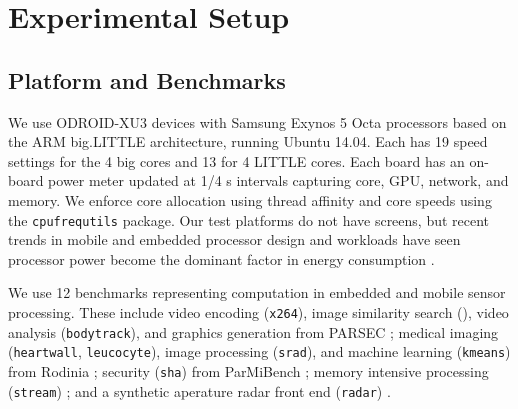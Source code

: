 \section{Experimental Setup}

\subsection{Platform and Benchmarks}
We use ODROID-XU3 devices with Samsung Exynos 5 Octa processors based
on the ARM big.LITTLE architecture, running Ubuntu 14.04. Each has 19
speed settings for the 4 big cores and 13 for 4 LITTLE cores.  Each
board has an on-board power meter updated at 1/4 s intervals capturing
core, GPU, network, and memory. We enforce core allocation using
thread affinity and core speeds using the \texttt{cpufrequtils}
package.  Our test platforms do not have screens, but recent trends in
mobile and embedded processor design and workloads have seen processor
power become the dominant factor in energy consumption
\cite{HPCA2016}.

We use 12 benchmarks representing computation in embedded and mobile
sensor processing.  These include video encoding (\texttt{x264}),
image similarity search (\cite{parsec}), video analysis
(\texttt{bodytrack}), and graphics generation from PARSEC
\cite{parsec}; medical imaging (\texttt{heartwall},
\texttt{leucocyte}), image processing (\texttt{srad}), and machine
learning (\texttt{kmeans}) from Rodinia \cite{rodinia}; security
(\texttt{sha}) from ParMiBench \cite{parmibench}; memory intensive
processing (\texttt{stream}) \cite{stream}; and a synthetic aperature
radar front end (\texttt{radar}) \cite{radar}.

